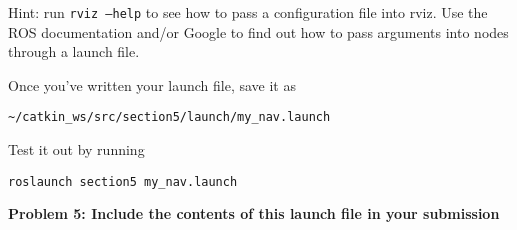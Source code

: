 \documentclass{article}
\begin{document}
Hint: run \texttt{rviz --help} to see how to pass a configuration file into rviz.
Use the ROS documentation and/or Google to find out how to pass arguments into nodes through a launch file.

Once you've written your launch file, save it as

\begin{verbatim}
~/catkin_ws/src/section5/launch/my_nav.launch
\end{verbatim}

Test it out by running

\begin{verbatim}
roslaunch section5 my_nav.launch
\end{verbatim}

\textbf{Problem 5: Include the contents of this launch file in your submission}
\end{document}
